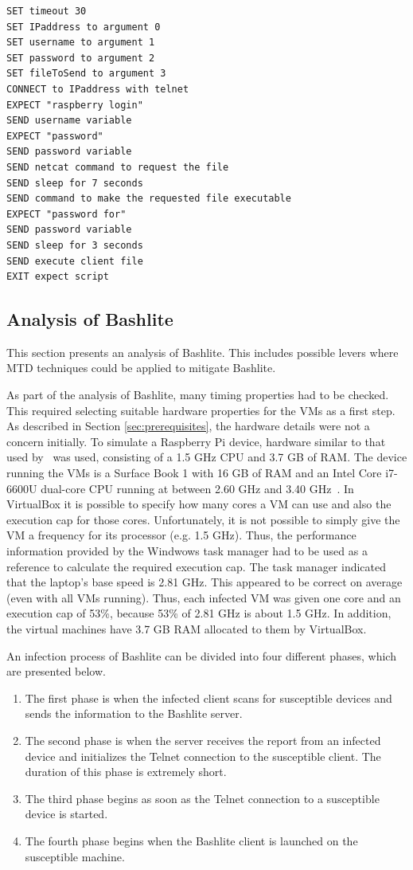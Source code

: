\begin{lstlisting}[caption={The \textit{Expect} Script in Pseudocode},label={expectPseudocode}]
SET timeout 30
SET IPaddress to argument 0
SET username to argument 1
SET password to argument 2
SET fileToSend to argument 3
CONNECT to IPaddress with telnet
EXPECT "raspberry login"
SEND username variable
EXPECT "password"
SEND password variable
SEND netcat command to request the file
SEND sleep for 7 seconds
SEND command to make the requested file executable
EXPECT "password for"
SEND password variable
SEND sleep for 3 seconds
SEND execute client file
EXIT expect script
\end{lstlisting}


\subsection{Analysis of Bashlite} \label{analysisOfBashlite}
This section presents an analysis of Bashlite. This includes possible levers where MTD techniques could be applied to mitigate Bashlite.

 
As part of the analysis of Bashlite, many timing properties had to be checked. This required selecting suitable hardware properties for the VMs as a first step. As described in Section \ref{sec:prerequisites}, the hardware details were not a concern initially. To simulate a Raspberry Pi device, hardware similar to that used by~\cite{article:vonderAssen} was used, consisting of a 1.5 GHz CPU and 3.7 GB of RAM. The device running the VMs is a Surface Book 1 with 16 GB of RAM and an Intel Core i7-6600U dual-core CPU running at between 2.60 GHz and 3.40 GHz~\cite{website:intelInfo}. In VirtualBox it is possible to specify how many cores a VM can use and also the execution cap for those cores. Unfortunately, it is not possible to simply give the VM a frequency for its processor (e.g. 1.5 GHz). Thus, the performance information provided by the Windwows task manager had to be used as a reference to calculate the required execution cap. The task manager indicated that the laptop's base speed is 2.81 GHz. This appeared to be correct on average (even with all VMs running). Thus, each infected VM was given one core and an execution cap of 53\%, because 53\% of 2.81 GHz is about 1.5 GHz. In addition, the virtual machines have 3.7 GB RAM allocated to them by VirtualBox.


An infection process of Bashlite can be divided into four different phases, which are presented below. 
\begin{enumerate}
\item The first phase is when the infected client scans for susceptible devices and sends the information to the Bashlite server.
\item The second phase is when the server receives the report from an infected device and initializes the Telnet connection to the susceptible client. The duration of this phase is extremely short.
\item The third phase begins as soon as the Telnet connection to a susceptible device is started.
\item The fourth phase begins when the Bashlite client is launched on the susceptible machine.
\end{enumerate}


